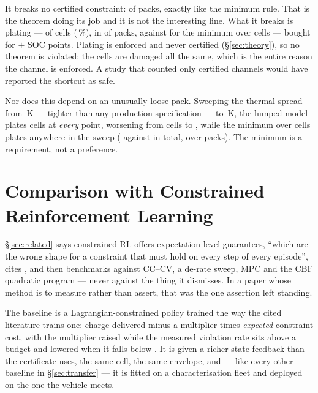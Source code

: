 \documentclass[11pt,letterpaper]{article}
\theoremstyle{definition}
\theoremstyle{remark}
\begin{document}
It breaks no certified constraint: \qMeanBreach{} of \qPacks{} packs, exactly like the minimum
rule. That is the theorem doing its job and it is not the interesting line. What it breaks is
plating --- \qMeanPlated{} of \qTotalCells{} cells (\qMeanPlatePct\,\%), in \qMeanPlatePacks{}
of \qPacks{} packs, against \qMinPlated{} for the minimum over cells --- bought for
$+$\qSocCost{} SOC points. Plating is enforced and never certified (\S\ref{sec:theory}), so no
theorem is violated; the cells are damaged all the same, which is the entire reason the channel
is enforced. A study that counted only certified channels would have reported the shortcut as
safe.

Nor does this depend on an unusually loose pack. Sweeping the thermal spread from \qSweepLo\,K
--- tighter than any production specification --- to \qSweepHi\,K, the lumped model plates cells
at \emph{every} point, worsening from \qSweepPlateLo{} cells to \qSweepPlateHi, while the
minimum over cells plates \qSweepMinPlate{} anywhere in the sweep (\qSweepLumped{} against
\qSweepMinPlate{} in total, over \qSweepPacks{} packs). The minimum is a requirement, not a
preference.




\section{Comparison with Constrained Reinforcement Learning}\label{sec:crl}

\S\ref{sec:related} says constrained RL offers expectation-level guarantees, ``which are the
wrong shape for a constraint that must hold on every step of every episode'', cites
\cite{achiam2017cpo,altman1999constrained}, and then benchmarks against CC--CV, a de-rate sweep,
MPC and the CBF quadratic program --- never against the thing it dismisses. In a paper whose
method is to measure rather than assert, that was the one assertion left standing.

The baseline is a Lagrangian-constrained policy trained the way the cited literature trains one:
charge delivered minus a multiplier times \emph{expected} constraint cost, with the multiplier
raised while the measured violation rate sits above a budget and lowered when it falls below
\cite{stooke2020pid}. It is given a richer state feedback than the certificate uses, the same
cell, the same envelope, and --- like every other baseline in \S\ref{sec:transfer} --- it is
fitted on a characterisation fleet and deployed on the one the vehicle meets.
\end{document}
